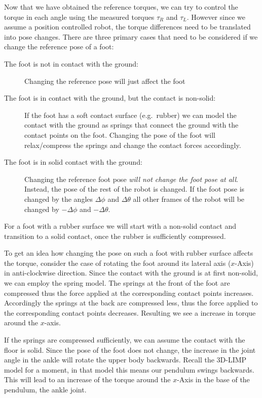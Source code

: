 \documentclass[english,ngerman]{KITreprt}
\begin{document}
Now that we have obtained the reference torques, we can try to control
the torque in each angle using the measured torques $\tau_R$ and
$\tau_L$. However since we assume a position controlled robot, the
torque differences need to be translated into pose changes. There are
three primary cases that need to be considered if we change the
reference pose of a foot:

\begin{description}
\item[The foot is not in contact with the ground:]
Changing the reference pose will just affect the foot
\item[The foot is in contact with the ground, but the contact is
non-solid:]
If the foot has a soft contact surface (e.g.~rubber) we can model the
contact with the ground as springs that connect the ground with the
contact points on the foot. Changing the pose of the foot will
relax/compress the springs and change the contact forces accordingly.
\item[The foot is in solid contact with the ground:]
Changing the reference foot pose \emph{will not change the foot pose at
all}. Instead, the pose of the rest of the robot is changed. If the foot
pose is changed by the angles $\Delta \phi$ and $\Delta \theta$ all
other frames of the robot will be changed by $-\Delta \phi$ and
$-\Delta \theta$.
\end{description}

For a foot with a rubber surface we will start with a non-solid contact
and transition to a solid contact, once the rubber is sufficiently
compressed. \cite{kajita2005running}

To get an idea how changing the pose on such a foot with rubber surface
affects the torque, consider the case of rotating the foot around its
lateral axis ($x$-Axis) in anti-clockwise direction. Since the contact
with the ground is at first non-solid, we can employ the spring model.
The springs at the front of the foot are compressed thus the force
applied at the corresponding contact points increases. Accordingly the
springs at the back are compressed less, thus the force applied to the
corresponding contact points decreases. Resulting we see a increase in
torque around the $x$-axis.

If the springs are compressed sufficiently, we can assume the contact
with the floor is solid. Since the pose of the foot does not change, the
increase in the joint angle in the ankle will rotate the upper body
backwards. Recall the 3D-LIMP model for a moment, in that model this
means our pendulum swings backwards. This will lead to an increase of
the torque around the $x$-Axis in the base of the pendulum, the ankle
joint.
\end{document}
